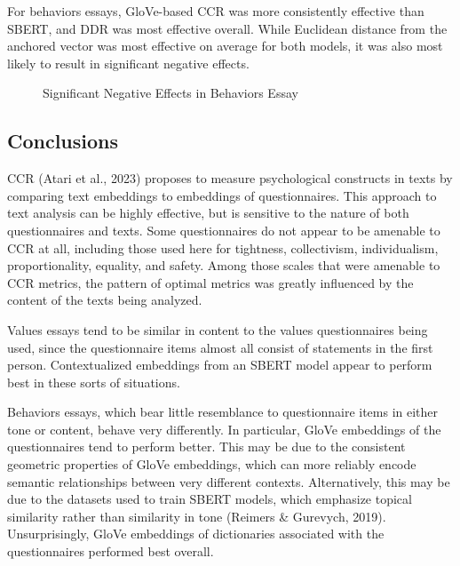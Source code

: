 \documentclass[
  man,
  floatsintext,
  longtable,
  nolmodern,
  notxfonts,
  notimes,
  colorlinks=true,linkcolor=blue,citecolor=blue,urlcolor=blue]{apa7}
\begin{document}
For behaviors essays, GloVe-based CCR was more consistently effective
than SBERT, and DDR was most effective overall. While Euclidean distance
from the anchored vector was most effective on average for both models,
it was also most likely to result in significant negative effects.

\begin{figure}

\caption{\label{fig-behaviors_essay_neg}Significant Negative Effects in
Behaviors Essay}


\end{figure}%

\subsection{Conclusions}\label{conclusions-1}

CCR (Atari et al., 2023) proposes to measure psychological constructs in
texts by comparing text embeddings to embeddings of questionnaires. This
approach to text analysis can be highly effective, but is sensitive to
the nature of both questionnaires and texts. Some questionnaires do not
appear to be amenable to CCR at all, including those used here for
tightness, collectivism, individualism, proportionality, equality, and
safety. Among those scales that were amenable to CCR metrics, the
pattern of optimal metrics was greatly influenced by the content of the
texts being analyzed.

Values essays tend to be similar in content to the values questionnaires
being used, since the questionnaire items almost all consist of
statements in the first person. Contextualized embeddings from an SBERT
model appear to perform best in these sorts of situations.

Behaviors essays, which bear little resemblance to questionnaire items
in either tone or content, behave very differently. In particular, GloVe
embeddings of the questionnaires tend to perform better. This may be due
to the consistent geometric properties of GloVe embeddings, which can
more reliably encode semantic relationships between very different
contexts. Alternatively, this may be due to the datasets used to train
SBERT models, which emphasize topical similarity rather than similarity
in tone (Reimers \& Gurevych, 2019). Unsurprisingly, GloVe embeddings of
dictionaries associated with the questionnaires performed best overall.
\end{document}

